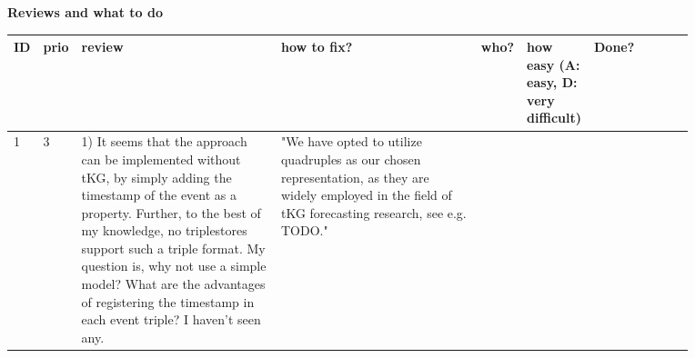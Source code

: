 \documentclass[a4paper]{article}
\begin{document}
\textbf{Reviews  and what to do}

\begin{table}
\begin{tabularx}{\linewidth}{p{0.03\linewidth}| p{0.03\linewidth}| p{0.3\linewidth}| p{0.30\linewidth}| p{0.03\linewidth} |p{0.03\linewidth}|p{0.15\linewidth}}
\tiny{ID} & \tiny{prio} & \tiny{review} & \tiny{ how to fix?} & \tiny{who?} & \tiny{how easy (A: easy, D: very difficult)} & \tiny{ Done?}\\
\hline
1  &  3    &  1) It seems that the approach can be implemented without tKG, by simply adding the timestamp of the event as a property.
Further, to the best of my knowledge, no triplestores support such a triple format.
My question is, why not use a simple model?
What are the advantages of registering the timestamp in each event triple?
I haven't seen any.      &  "We have opted to utilize quadruples as our chosen representation, as they are widely employed in the field of tKG forecasting research, see e.g. TODO."


\end{tabularx}
\end{table}
\end{document}
